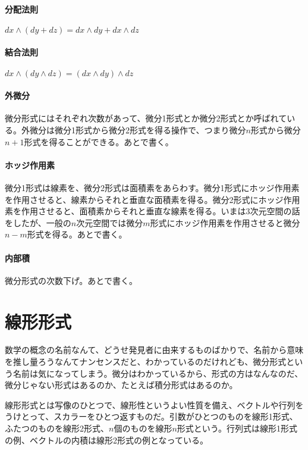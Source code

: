 \paragraph{分配法則}

$ d x \wedge ( d y + d z ) = d x \wedge d y + d x \wedge d z $

\paragraph{結合法則}

$ d x \wedge (d y \wedge d z) = (d x \wedge d y) \wedge d z $

\paragraph{外微分}

微分形式にはそれぞれ次数があって、微分1形式とか微分2形式とか呼ばれている。外微分は微分1形式から微分2形式を得る操作で、つまり微分$n$形式から微分$n+1$形式を得ることができる。あとで書く。

\paragraph{ホッジ作用素}

微分1形式は線素を、微分2形式は面積素をあらわす。微分1形式にホッジ作用素を作用させると、線素からそれと垂直な面積素を得る。微分2形式にホッジ作用素を作用させると、面積素からそれと垂直な線素を得る。いまは3次元空間の話をしたが、一般の$n$次元空間では微分$m$形式にホッジ作用素を作用させると微分$n-m$形式を得る。あとで書く。

\paragraph{内部積}

微分形式の次数下げ。あとで書く。


\section{線形形式}

数学の概念の名前なんて、どうせ発見者に由来するものばかりで、名前から意味を推し量ろうなんてナンセンスだと、わかっているのだけれども、微分形式という名前は気になってしまう。微分はわかっているから、形式の方はなんなのだ、微分じゃない形式はあるのか、たとえば積分形式はあるのか。

線形形式とは写像のひとつで、線形性というよい性質を備え、ベクトルや行列をうけとって、スカラーをひとつ返すものだ。引数がひとつのものを線形1形式、ふたつのものを線形2形式、$n$個のものを線形$n$形式という。行列式は線形1形式の例、ベクトルの内積は線形2形式の例となっている。

